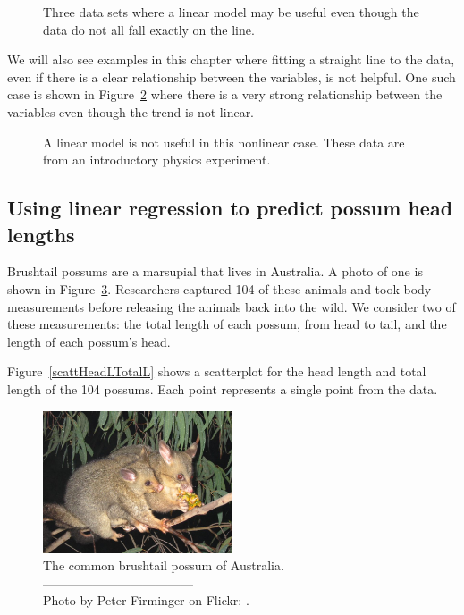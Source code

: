 \begin{figure}[h]
   \centering
   \caption{Three data sets where a linear model may be useful even though the data do not all fall exactly on the line.}
   \label{imperfLinearModel}
\end{figure}

We will also see examples in this chapter where fitting a straight line to the data, even if there is a clear relationship between the variables, is not helpful. One such case is shown in Figure~\ref{notGoodAtAllForALinearModel} where there is a very strong relationship between the variables even though the trend is not linear. 

\begin{figure}[h]
   \centering
   \caption{A linear model is not useful in this nonlinear case. These data are from an introductory physics experiment.}
   \label{notGoodAtAllForALinearModel}
\end{figure}


\D{\newpage}

\subsection{Using linear regression to predict possum head lengths}

Brushtail possums are a marsupial that lives in Australia.  A photo of one is shown in Figure~\ref{possumpic}.  Researchers captured 104 of these animals and took body measurements before releasing the animals back into the wild.  We consider two of these measurements:  the total length of each possum, from head to tail, and the length of each possum's head.  

Figure~\ref{scattHeadLTotalL} shows a scatterplot for the head length and total length of the 104 possums. Each point represents a single point from the data.



\begin{figure}[h]
   \centering
   \includegraphics[width=0.5\textwidth]{ch_regr_simple_linear/figures/possumPic/possumPic}
   \caption{The common brushtail possum of Australia.\vspace{-1mm}\\
------------------------------------\vspace{-2mm}\\
{\footnotesize Photo by Peter Firminger on Flickr:  .}}
   \label{possumpic}
\end{figure}

